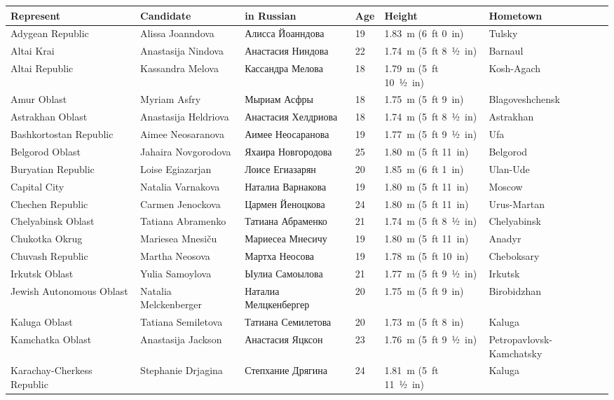 \documentclass{article}
\begin{document}
\begin{tabular}{llllll}
\toprule
Represent & Candidate & in Russian & Age & Height & Hometown \\
\midrule
Adygean Republic & Alissa Joanndova & Алисса Йоанндова & 19 & 1.83 m (6 ft 0 in) & Tulsky \\
Altai Krai & Anastasija Nindova & Анастасия Ниндова & 22 & 1.74 m (5 ft 8 1⁄2 in) & Barnaul \\
Altai Republic & Kassandra Melova & Кассандра Мелова & 18 & 1.79 m (5 ft 10 1⁄2 in) & Kosh-Agach \\
Amur Oblast & Myriam Asfry & Мыриам Асфры & 18 & 1.75 m (5 ft 9 in) & Blagoveshchensk \\
Astrakhan Oblast & Anastasija Heldriova & Анастасия Хелдриова & 18 & 1.74 m (5 ft 8 1⁄2 in) & Astrakhan \\
Bashkortostan Republic & Aimee Neosaranova & Аимее Неосаранова & 19 & 1.77 m (5 ft 9 1⁄2 in) & Ufa \\
Belgorod Oblast & Jahaira Novgorodova & Яхаира Новгородова & 25 & 1.80 m (5 ft 11 in) & Belgorod \\
Buryatian Republic & Loise Egiazarjan & Лоисе Егиазарян & 20 & 1.85 m (6 ft 1 in) & Ulan-Ude \\
Capital City & Natalia Varnakova & Наталиа Варнакова & 19 & 1.80 m (5 ft 11 in) & Moscow \\
Chechen Republic & Carmen Jenockova & Цармен Йеноцкова & 24 & 1.80 m (5 ft 11 in) & Urus-Martan \\
Chelyabinsk Oblast & Tatiana Abramenko & Татиана Абраменко & 21 & 1.74 m (5 ft 8 1⁄2 in) & Chelyabinsk \\
Chukotka Okrug & Mariesea Mnesiču & Мариесеа Мнесичу & 19 & 1.80 m (5 ft 11 in) & Anadyr \\
Chuvash Republic & Martha Neosova & Мартха Неосова & 19 & 1.78 m (5 ft 10 in) & Cheboksary \\
Irkutsk Oblast & Yulia Samoylova & Ыулиа Самоылова & 21 & 1.77 m (5 ft 9 1⁄2 in) & Irkutsk \\
Jewish Autonomous Oblast & Natalia Melckenberger & Наталиа Мелцкенбергер & 20 & 1.75 m (5 ft 9 in) & Birobidzhan \\
Kaluga Oblast & Tatiana Semiletova & Татиана Семилетова & 20 & 1.73 m (5 ft 8 in) & Kaluga \\
Kamchatka Oblast & Anastasija Jackson & Анастасия Яцксон & 23 & 1.76 m (5 ft 9 1⁄2 in) & Petropavlovsk-Kamchatsky \\
Karachay-Cherkess Republic & Stephanie Drjagina & Степхание Дрягина & 24 & 1.81 m (5 ft 11 1⁄2 in) & Kaluga \\

\end{tabular}
\end{document}
